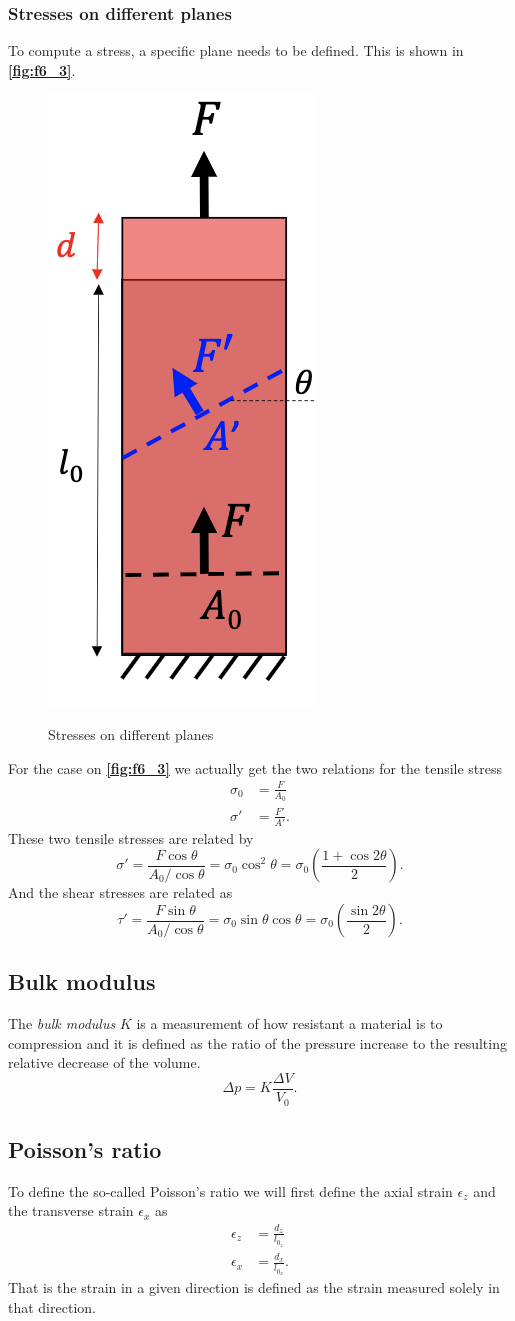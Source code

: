 \subsubsection{Stresses on different planes}
To compute a stress, a specific plane needs to be defined. This is shown in \textbf{\autoref{fig:f6_3}}.
\begin{figure} [ht]
  \centering
  \caption{Stresses on different planes}
  \includegraphics[width=0.15\linewidth]{./figures/f6_3.png}
  \label{fig:f6_3}
\end{figure}
For the case on \textbf{\autoref{fig:f6_3}} we actually get the two relations for the tensile stress
\begin{align*}
  \sigma_0 &= \frac{F}{A_0} \\
  \sigma' &= \frac{F'}{A'}
.\end{align*}
These two tensile stresses are related by
\[ 
\sigma' = \frac{F \cos\theta}{A_0 / \cos\theta} = \sigma_0 \cos^2\theta = \sigma_0 \left( \frac{1 + \cos 2\theta}{2} \right)
.\]
And the shear stresses are related as
\[ 
\tau' = \frac{F \sin\theta}{A_0 / \cos\theta} = \sigma_0 \sin\theta \cos\theta = \sigma_0 \left( \frac{\sin 2\theta}{2} \right)
.\]

\subsection{Bulk modulus}
The \textit{bulk modulus} $K$ is a measurement of how resistant a material is to compression and it is defined as the ratio of the pressure increase to the resulting relative decrease of the volume.
\[ 
\Delta p = K \frac{\Delta V}{V_0}
.\]

\subsection{Poisson's ratio}
To define the so-called Poisson's ratio we will first define the axial strain $\epsilon_z$ and the transverse strain $\epsilon_x$ as
\begin{align*}
  \epsilon_z &= \frac{d_z}{l_{0_z}} \\
  \epsilon_x &= \frac{d_x}{l_{0_x}}
.\end{align*}
That is the strain in a given direction is defined as the strain measured solely in that direction.

